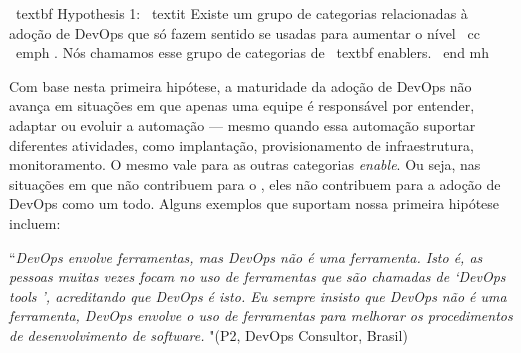 \begin{mh}
\ textbf {Hypothesis 1:} \ textit {Existe um grupo de categorias relacionadas à adoção de DevOps que só fazem sentido se usadas para aumentar o nível} \ cc \ emph {. Nós
chamamos esse grupo de categorias de \ textbf {enablers}}.
\ end {mh}

Com base nesta primeira hipótese, a maturidade da adoção de DevOps não
avança em situações em que apenas uma equipe é responsável por entender, adaptar ou
evoluir a automação --- mesmo quando essa automação suportar diferentes atividades, como implantação, provisionamento de infraestrutura,
monitoramento. O mesmo vale para as outras categorias \emph{enable}. Ou seja, nas situações em que
 não contribuem para
o \cc, eles não contribuem para a adoção de DevOps como um todo. Alguns exemplos
que suportam nossa primeira hipótese incluem:



\begin{mq}
``\emph{DevOps envolve ferramentas, mas DevOps não é uma ferramenta. Isto é, as pessoas muitas vezes
focam no uso de ferramentas que são chamadas de `DevOps tools ', acreditando que DevOps é
isto. Eu sempre insisto que DevOps não é uma ferramenta, DevOps envolve o uso de
ferramentas para melhorar os procedimentos de desenvolvimento de software.} "(P2, DevOps
Consultor, Brasil)
\end{mq}




\end{mh}
